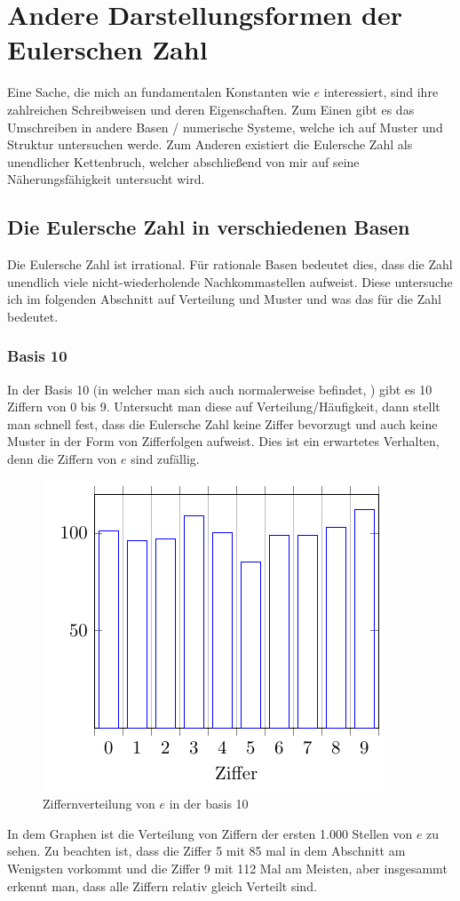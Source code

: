 \section{Andere Darstellungsformen der Eulerschen Zahl}
Eine Sache, die mich an fundamentalen Konstanten wie $e$ interessiert, sind ihre zahlreichen Schreibweisen und deren Eigenschaften. Zum Einen gibt es das Umschreiben in andere Basen / numerische Systeme, welche ich auf Muster und Struktur untersuchen werde. Zum Anderen existiert die Eulersche Zahl als unendlicher Kettenbruch, welcher abschließend von mir auf seine Näherungsfähigkeit untersucht wird. 
\subsection{Die Eulersche Zahl in verschiedenen Basen}
Die Eulersche Zahl ist irrational. Für rationale Basen bedeutet dies, dass die Zahl unendlich viele nicht-wiederholende Nachkommastellen aufweist. Diese untersuche ich im folgenden Abschnitt auf Verteilung und Muster und was das für die Zahl bedeutet.
\subsubsection{Basis 10}
In der Basis 10 (in welcher man sich auch normalerweise befindet, ) gibt es 10 Ziffern von 0 bis 9. Untersucht man diese auf Verteilung/Häufigkeit, dann stellt man schnell fest, dass die Eulersche Zahl keine Ziffer bevorzugt und auch keine Muster in der Form von Zifferfolgen aufweist. Dies ist ein erwartetes Verhalten, denn die Ziffern von $e$ sind zufällig.
\begin{figure}[h]
  \includegraphics{medien2/basis10/basis10.pdf}
  \centering
  \caption{Ziffernverteilung von $e$ in der basis 10}
\end{figure}
\newpage
\par In dem Graphen ist die Verteilung von Ziffern der ersten 1.000 Stellen von $e$ zu sehen. Zu beachten ist, dass die Ziffer 5 mit 85 mal in dem Abschnitt am Wenigsten vorkommt und die Ziffer 9 mit 112 Mal am Meisten, aber insgesammt erkennt man, dass alle Ziffern relativ gleich Verteilt sind.
